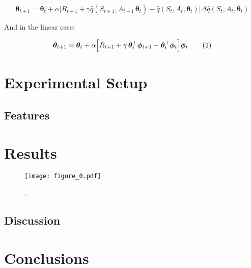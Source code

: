 \documentclass{article}
\begin{document}
	\begin{equation}\label{eqn:update}
	\bm{\theta}_{t+1} =
	\bm{\theta}_t +
	\alpha \Big[
		R_{t+1} +
		\gamma \hat{q}(S_{t+1}, A_{t+1}\, \bm{\theta}_t)
		- \hat{q}(S_t, A_t, \bm{\theta}_t)
	\Big]
	\Delta\hat{q}(S_t, A_t, \bm{\theta}_t)\tag{1}
	\end{equation}

	And in the linear case:

	\begin{equation}\label{eqn:linear_update}
		\bm{\theta}_{t+1} =
		\bm{\theta}_t +
			\alpha \Big[
				R_{t+1} + \gamma\, \bm{\theta}_t^\top\bm{\phi}_{t+1} \space
				- \bm{\theta}_t^\top\bm{\phi}_t
			\Big]\bm{\phi}_t\tag{2}
	\end{equation}




	\section{Experimental Setup}

	\subsection{Features}



	\section{Results}


		\begin{figure}[h]
			\begin{center}
				\texttt{[image: figure\_0.pdf]}
				\caption{.}
			\end{center}
		\end{figure}

	\subsection{Discussion}



	\section{Conclusions}


	\clearpage
\end{document}
